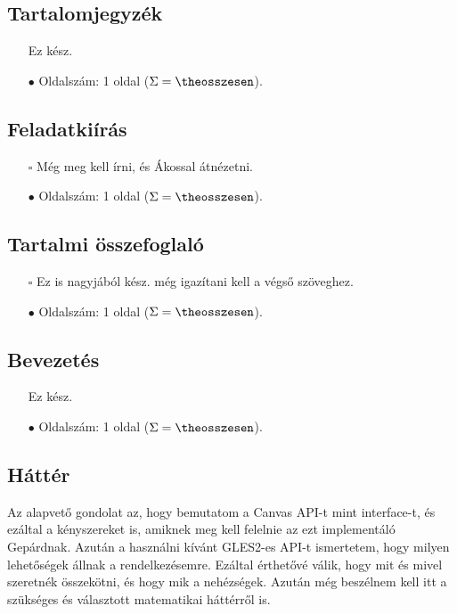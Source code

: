 \documentclass[12pt]{article}
\newcounter{osszesen}
\newcommand*{\oldalak}[1]{#1 oldal \setcounter{osszesen}{\theosszesen +
#1}($\Sigma=\theosszesen$)}
\begin{document}
\subsection*{Tartalomjegyzék}

\begin{itemize}[noitemsep]
  \item[\checkmark] Ez kész.
  \item[$\bullet$] Oldalszám: \oldalak{1}.
\end{itemize}

\subsection*{Feladatkiírás}

\begin{itemize}[noitemsep]
  \item[$\square$] Még meg kell írni, és Ákossal átnézetni.
  \item[$\bullet$] Oldalszám: \oldalak{1}.
\end{itemize}

\subsection*{Tartalmi összefoglaló}

\begin{itemize}[noitemsep]
  \item[$\square$] Ez is nagyjából kész. még igazítani kell a végső szöveghez.
  \item[$\bullet$] Oldalszám: \oldalak{1}.
\end{itemize}

\subsection*{Bevezetés}

\begin{itemize}[noitemsep]
  \item[\checkmark] Ez kész.
  \item[$\bullet$] Oldalszám: \oldalak{1}.
\end{itemize}

\subsection{Háttér }

Az alapvető gondolat az, hogy bemutatom a Canvas API-t mint interface-t, és
ezáltal a kényszereket is, amiknek meg kell felelnie az ezt implementáló
Gepárdnak. Azután a használni kívánt GLES2-es API-t ismertetem, hogy
milyen lehetőségek állnak a rendelkezésemre. Ezáltal érthetővé válik,
hogy mit és mivel szeretnék összekötni, és hogy mik a nehézségek.
Azután még beszélnem kell itt a szükséges és választott matematikai
háttérről is.
\end{document}
